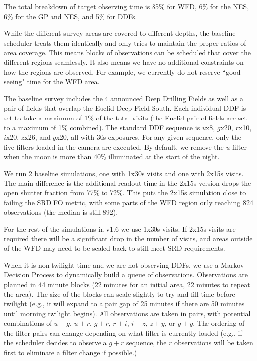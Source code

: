 The total breakdown of target observing time is 85\% for WFD, 6\% for the NES, 6\% for the GP and NES, and 5\% for DDFs.


While the different survey areas are covered to different depths, the baseline scheduler treats them identically and only tries to maintain the proper ratios of area coverage. This means blocks of observations can be scheduled that cover the different regions seamlessly. It also means we have no additional constraints on how the regions are observed. For example, we currently do not reserve ``good seeing" time for the WFD area. 

The baseline survey includes the 4 announced Deep Drilling Fields as well as a pair of fields that overlap the Euclid Deep Field South.  Each individual DDF is set to take a maximum of 1\% of the total visits (the Euclid pair of fields are set to a maximum of 1\% combined). The standard DDF sequence is $u$x8, $g$x20, $r$x10, $i$x20, $z$x26, and $y$x20, all with 30s exposures. For any given sequence, only the five filters loaded in the camera are executed. By default, we remove the $u$ filter when the moon is more than 40\% illuminated at the start of the night. 


We run 2 baseline simulations, one with 1x30s visits and one with 2x15s visits.  The main difference is the additional readout time in the 2x15s version drops the open shutter fraction from 77\% to 72\%. This puts the 2x15s simulation close to failing the SRD FO metric, with some parts of the WFD region only reaching 824 observations (the median is still 892). 

For the rest of the simulations in v1.6 we use 1x30s visits.  If 2x15s visits are required there will be a significant drop in the number of visits, and areas outside of the WFD may need to be scaled back to still meet SRD requirements.

When it is non-twilight time and we are not observing DDFs, we use a Markov Decision Process to dynamically build a queue of observations.  Observations are planned in 44 minute blocks (22 minutes for an initial area, 22 minutes to repeat the area). The size of the blocks can scale slightly to try and fill time before twilight (e.g., it will expand to a pair gap of 25 minutes if there are 50 minutes until morning twilight begins). All observations are taken in pairs, with potential combinations of $u+g$, $u+r$, $g+r$, $r+i$, $i+z$, $z+y$, or $y+y$. The ordering of the filter pairs can change depending on what filter is currently loaded (e.g., if the scheduler decides to observe a $g+r$ sequence, the $r$ observations will be taken first to eliminate a filter change if possible.)

